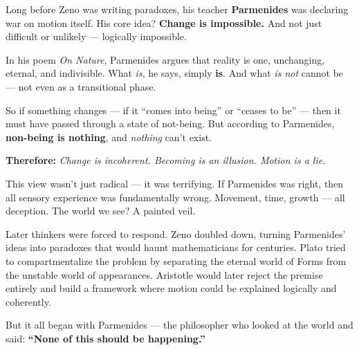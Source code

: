 \begin{tcolorbox}[title=Historical Sidebar: Parmenides and the War on Motion, colback=gray!5, colframe=black, fonttitle=\bfseries]

  Long before Zeno was writing paradoxes, his teacher \textbf{Parmenides} was declaring war on motion itself. His core idea? \textbf{Change is impossible.} And not just difficult or unlikely — logically impossible.

  \medskip
  
  In his poem \textit{On Nature}, Parmenides argues that reality is one, unchanging, eternal, and indivisible. What \emph{is}, he says, simply \textbf{is}. And what \emph{is not} cannot be — not even as a transitional phase.

  \medskip
  
  So if something changes — if it “comes into being” or “ceases to be” — then it must have passed through a state of not-being. But according to Parmenides, \textbf{non-being is nothing}, and \textit{nothing} can’t exist.
  
  \medskip
  
  \textbf{Therefore:} \textit{Change is incoherent. Becoming is an illusion. Motion is a lie.}

  \medskip
  
  This view wasn’t just radical — it was terrifying. If Parmenides was right, then all sensory experience was fundamentally wrong. Movement, time, growth — all deception. The world we see? A painted veil.
  
  \medskip
  
  Later thinkers were forced to respond. Zeno doubled down, turning Parmenides’ ideas into paradoxes that would haunt mathematicians for centuries. Plato tried to compartmentalize the problem by separating the eternal world of Forms from the unstable world of appearances. Aristotle would later reject the premise entirely and build a framework where motion could be explained logically and coherently.

  \medskip
  
  But it all began with Parmenides — the philosopher who looked at the world and said: \textbf{“None of this should be happening.”}
  
\end{tcolorbox}
  